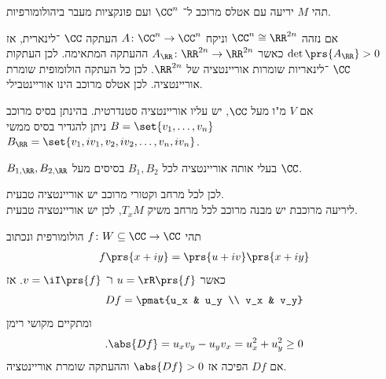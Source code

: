 \documentclass[a4paper,10pt,twoside,openany]{book}
\begin{document}
\begin{example}
תהי
$M$
יריעה עם אטלס מרוכב ל־%
$\CC^n$
ועם פונקציות מעבר ביהולומורפיות.
\begin{exercise}
אם נזהה
$\CC^n \cong \RR^{2n}$
וניקח
$A \colon \CC^n \to \CC^n$
העתקה
$\CC$%
־לינארית, אז
$\det\prs{A_{\RR}} > 0$
כאשר
$A_{\RR} \colon \RR^{2n} \to \RR^{2n}$
ההעתקה המתאימה.
לכן העתקות
$\CC$%
־לינאריות שומרות אוריינטציה של
$\RR^{2n}$.
לכן%
 כל העתקה הולומופית שומרת אוריינטציה.
לכן אטלס מרוכב הינו אוריינטבילי.
\end{exercise}
\end{example}
\begin{example}
אם
$V$
מ"ו מעל
$\CC$,
יש עליו אוריינטציה סטנדרטית.
בהינתן בסיס מרוכב
$B = \set{v_1, \ldots, v_n}$
ניתן להגדיר בסיס ממשי
$B_{\RR} = \set{v_1, iv_1, v_2, iv_2, \ldots, v_n, iv_n}$.
\begin{exercise}
$B_{1, \RR}, B_{2,\RR}$
בעלי אותה אוריינטציה לכל
$B_1, B_2$
בסיסים מעל
$\CC$.
\end{exercise}
לכן לכל מרחב וקטורי מרוכב יש אוריינטציה טבעית.
\\
ליריעה מרוכבת יש מבנה מרוכב לכל מרחב משיק
$T_x M$,
לכן יש אוריינטציה טבעית.
\end{example}
\begin{example}
תהי
$f \colon W \subseteq \CC \to \CC$
הולומורפית ונכתוב
\begin{align*}
f\prs{x+iy} = \prs{u+iv}\prs{x+iy}
\end{align*}
כאשר
$u = \rR\prs{f}$
ו־%
$v = \iI\prs{f}$.
אז
\[Df = \pmat{u_x & u_y \\ v_x & v_y}\]
ומתקיים
מקושי רימן
\[\text{.} \abs{Df} = u_x v_y - u_y v_x = u_x^2 + u_y^2 \geq 0\]
אם
$Df$
הפיכה אז
$\abs{Df} > 0$
וההעתקה שומרת אוריינטציה.
\end{example}
\end{document}
